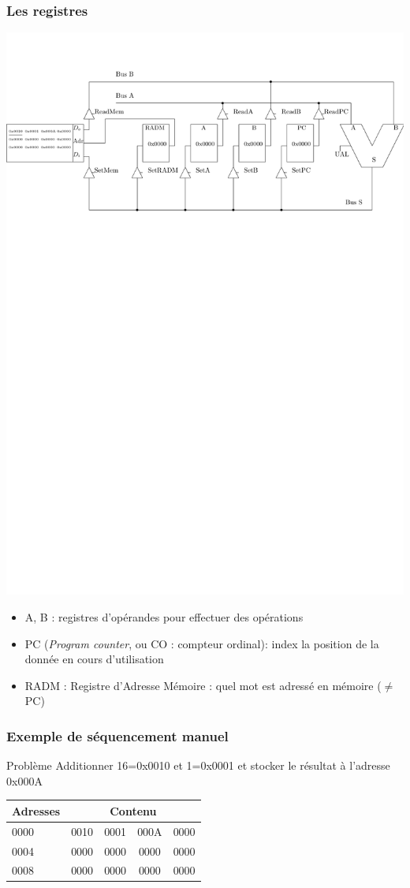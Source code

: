 \documentclass{beamer}
\begin{document}
\begin{frame}
\frametitle{Les registres}

\centering\includegraphics[width=0.9\columnwidth]{Figs/premier_chemin.pdf}
\begin{itemize}
\item A, B : registres d'opérandes pour effectuer des opérations
\item PC (\emph{Program counter}, ou CO : compteur ordinal): index la position de la donnée en cours d'utilisation
\item RADM : Registre d'Adresse Mémoire : quel mot est adressé en mémoire ($\neq$ PC)
\end{itemize}
\end{frame}

\begin{frame}
\frametitle{Exemple de séquencement manuel}
\begin{block}{Problème}
Additionner 16=0x0010 et 1=0x0001 et stocker le résultat à l'adresse 0x000A\\
\centering\begin{tabular}{l|cccc}
Adresses & \multicolumn{4}{c}{Contenu}\\
\hline
0000 & 0010 & 0001 & 000A & 0000\\
0004 & 0000 & 0000 & 0000 & 0000\\
0008 & 0000 & 0000 & 0000 & 0000
\end{tabular}
\end{block}
\end{frame}
\end{document}
